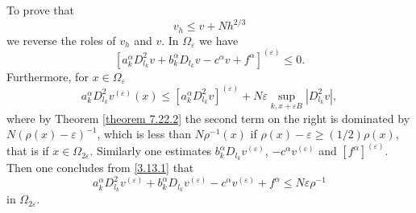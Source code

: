 \documentclass[11pt, reqno]{amsart}
\theoremstyle{definition}
\theoremstyle{remark}
\begin{document}
To prove that 
\begin{equation}
                                                        \label{7.9.1}
v_{h}\leq v+Nh^{2/3}
\end{equation}
 we reverse the roles
of $v_{h}$ and $v$. In $\Omega_{\varepsilon}$ we have
\begin{equation}
                                           \label{3.13.1}
  [a_{k}^{\alpha} D^{2}_{l_{k}}v  
+b_{k}^{\alpha}  D _{l_{k}}v 
-c^{\alpha} v +f^{\alpha}]^{(\varepsilon)}\leq0.
\end{equation}
Furthermore, for $x\in\Omega_{\varepsilon}$
$$
a^{\alpha}_{k}D^{2}_{l_{k}}v^{(\varepsilon)}(x)
\leq [a_{k}^{\alpha} D^{2}_{l_{k}}v]^{(\varepsilon)}
+N\varepsilon\sup_{k,x+\varepsilon B} |D^{2}_{l_{k}}v|,
$$
where by Theorem \ref{theorem 7.22.2} the second term on  the right 
is dominated by $N(\rho(x)-\varepsilon)^{-1}$, which is less
than $N\rho^{-1}(x)$ if $\rho(x)-\varepsilon\geq(1/2)\rho(x)$,
 that is if $x\in\Omega_{2\varepsilon}$.
Similarly one estimates $ b_{k}^{\alpha}  D _{l_{k}}v^{(\varepsilon)} $,
 $-c^{\alpha}v^{(\varepsilon)} $ and $[f^{\alpha}]^{(\varepsilon)}$.
 Then one concludes from \eqref{3.13.1}
that
\begin{equation}
                                                        \label{7.8.4}
  a_{k}^{\alpha} D^{2}_{l_{k}}v^{(\varepsilon)}  
+b_{k}^{\alpha}  D _{l_{k}}v^{(\varepsilon)} 
-c^{\alpha}v^{(\varepsilon)} + f^{\alpha} \leq
N\varepsilon\rho^{-1} 
\end{equation}
in $\Omega_{2\varepsilon}$.
\end{document}
